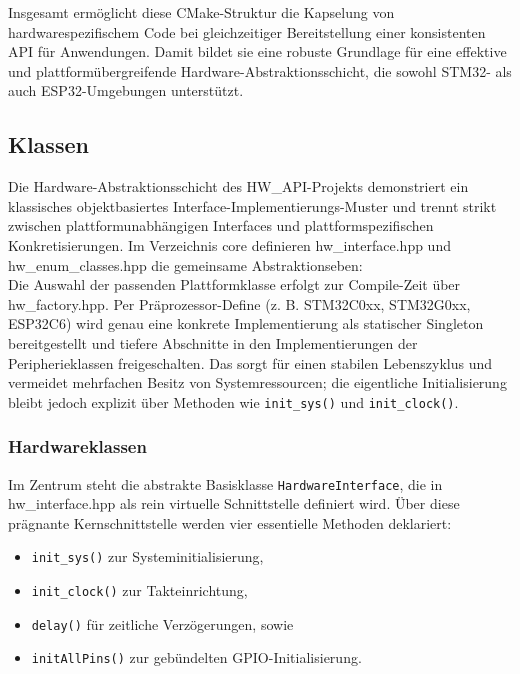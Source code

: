 Insgesamt ermöglicht diese CMake-Struktur die Kapselung von hardwarespezifischem Code bei gleichzeitiger Bereitstellung einer konsistenten API für Anwendungen. 
Damit bildet sie eine robuste Grundlage für eine effektive und plattformübergreifende Hardware-Abstraktionsschicht, die sowohl STM32- als auch ESP32-Umgebungen unterstützt.

\subsection{Klassen}
Die Hardware-Abstraktionsschicht des HW\_API-Projekts demonstriert ein klassisches objektbasiertes Interface-Implementierungs-Muster und trennt strikt zwischen plattformunabhängigen Interfaces und plattformspezifischen Konkretisierungen. 
Im Verzeichnis core definieren hw\_interface.hpp und hw\_enum\_classes.hpp die gemeinsame Abstraktionseben:\\
Die Auswahl der passenden Plattformklasse erfolgt zur Compile-Zeit über hw\_factory.hpp.
Per Präprozessor-Define (z. B. STM32C0xx, STM32G0xx, ESP32C6) wird genau eine konkrete Implementierung als statischer Singleton bereitgestellt und tiefere Abschnitte in den Implementierungen der Peripherieklassen freigeschalten.
Das sorgt für einen stabilen Lebenszyklus und vermeidet mehrfachen Besitz von Systemressourcen; die eigentliche Initialisierung bleibt jedoch explizit über Methoden wie \texttt{init\_sys()} und \texttt{init\_clock()}.

\subsubsection{Hardwareklassen}
Im Zentrum steht die abstrakte Basisklasse \texttt{HardwareInterface}, die in hw\_interface.hpp als rein virtuelle Schnittstelle definiert wird. 
Über diese prägnante Kernschnittstelle werden vier essentielle Methoden deklariert:

\begin{itemize}
	\item \texttt{init\_sys()} zur Systeminitialisierung, 
	\item \texttt{init\_clock()} zur Takteinrichtung,
	\item \texttt{delay()} für zeitliche Verzögerungen, sowie 
	\item \texttt{initAllPins()} zur gebündelten GPIO-Initialisierung.
\end{itemize}

